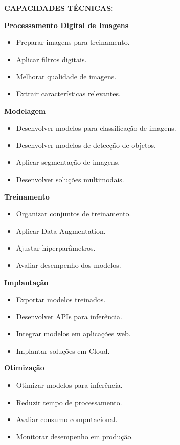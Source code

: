 \textbf{CAPACIDADES TÉCNICAS:}

\textbf{Processamento Digital de Imagens}

\begin{itemize}
\item Preparar imagens para treinamento.
\item Aplicar filtros digitais.
\item Melhorar qualidade de imagens.
\item Extrair características relevantes.
\end{itemize}

\textbf{Modelagem}

\begin{itemize}
\item Desenvolver modelos para classificação de imagens.
\item Desenvolver modelos de detecção de objetos.
\item Aplicar segmentação de imagens.
\item Desenvolver soluções multimodais.
\end{itemize}

\textbf{Treinamento}

\begin{itemize}
\item Organizar conjuntos de treinamento.
\item Aplicar Data Augmentation.
\item Ajustar hiperparâmetros.
\item Avaliar desempenho dos modelos.
\end{itemize}

\textbf{Implantação}

\begin{itemize}
\item Exportar modelos treinados.
\item Desenvolver APIs para inferência.
\item Integrar modelos em aplicações web.
\item Implantar soluções em Cloud.
\end{itemize}

\textbf{Otimização}

\begin{itemize}
\item Otimizar modelos para inferência.
\item Reduzir tempo de processamento.
\item Avaliar consumo computacional.
\item Monitorar desempenho em produção.
\end{itemize}

